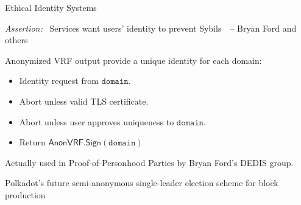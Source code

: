 \documentclass[fleqn,xcolor={usenames,dvipsnames},notes,aspectratio=169]{beamer} %
\newcommand{\algo}[1]{\ensuremath{\mathsf{#1}}}
\newcommand{\Sign}{\algo{Sign}}
\begin{document}
\begin{frame}{Ethical Identity Systems}

\medskip

{\em Assertion:} \, Services want users' identity to prevent Sybils \,\, -- Bryan Ford and others

\bigskip
\bigskip

Anonymized VRF output provide a unique identity for each domain:
\begin{itemize}
\item Identity request from $\texttt{domain}$.
\item Abort unless valid TLS certificate.
\item Abort unless user approves uniqueness to $\texttt{domain}$.
\item Return $\algo{AnonVRF}.\Sign(\texttt{domain})$
\end{itemize}

\bigskip

Actually used in Proof-of-Personhood Parties by Bryan Ford's DEDIS group.

\pause
\bigskip
\bigskip

Polkadot's future semi-anonymous single-leader election scheme for block production

\end{frame}
\end{document}
